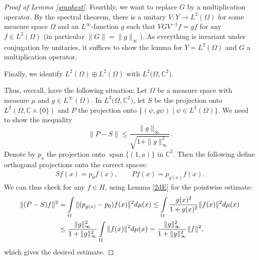 \documentclass[10pt,a4paper]{amsart}
\DeclareMathOperator{\spann}{span}
\begin{document}
\begin{proof}[Proof of Lemma \ref{graphest}]
		Fourthly, we want to replace $G$ by a multiplication operator. By the spectral theorem, there is a unitary $V\colon Y\to L^2(\Omega)$ for some measure space $\Omega$ and an $L^\infty$-function $g$ such that $VGV^{-1}f=gf$ for any $f\in L^2(\Omega)$ (in particular $\|G\|=\|g\|_\infty$). As everything is invariant under conjugation by unitaries, it suffices to show the lemma for $Y=L^2(\Omega)$ and $G$ a multiplication operator.
		
		Finally, we identify $L^2(\Omega)\oplus L^2(\Omega)$ with $L^2\bigl(\Omega,\mathbb{C}^2\bigr)$.
		
		Thus, overall, have the following situation: Let $\Omega$ be a measure space with measure $\mu$ and $g\in L^\infty(\Omega)$. In $L^2\bigl(\Omega, \mathbb{C}^2\bigr)$, let $S$ be the projection onto $L^2(\Omega,\mathbb{C}\times\{0\})$ and $P$ the projection onto $\bigl\{(\psi,g\psi)\mid \psi\in L^2(\Omega)\bigr\}$. We need to show the inequality
		\[
        \|P-S\|\leq \frac{\|g\|_\infty}{\sqrt{1+\|g\|_\infty^2}}.
        \]
		Denote by $p_a$ the projection onto $\spann\{(1,a)\}$ in $\mathbb{C}^2$. Then the following define orthogonal projections onto the correct spaces:
		\begin{gather*}
        Sf(x)=p_0f(x),\qquad
        Pf(x)=p_{g(x)}f(x).
        \end{gather*}
		We can thus check for any $f\in H$, using Lemma \ref{2dE} for the pointwise estimate:
		\begin{align*}
			\|(P-S)f\|^2
			&=\int\limits_\Omega\|(p_{g(x)}-p_0)f(x)\|^2{\rm d}\mu(x)
			 \leq\int\limits_\Omega\frac{g(x)^2}{1+g(x)^2}\|f(x)\|^2{\rm d}\mu(x)\\
			&\leq\frac{\|g\|_\infty^2}{1+\|g\|_\infty^2}\int\limits_\Omega\|f(x)\|^2{\rm d}\mu(x)
			 =\frac{\|g\|_\infty^2}{1+\|g\|_\infty^2}\|f\|^2,
		\end{align*}
		which gives the desired estimate.
	\end{proof}
\end{document}
